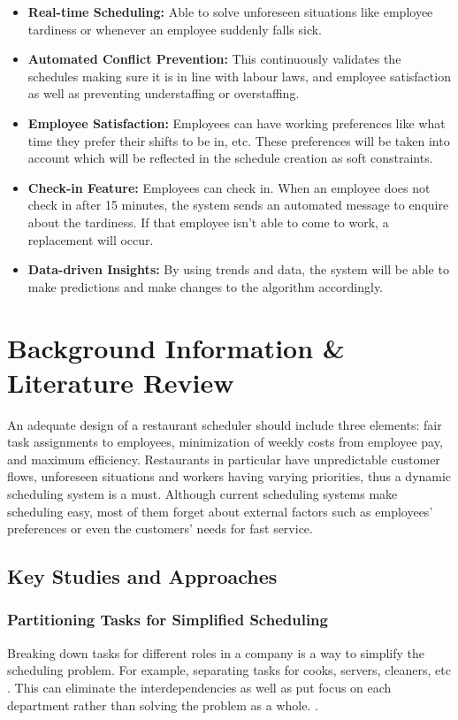 \documentclass[a4paper,12pt, oneside]{report}
\begin{document}
\begin{itemize}
    \item {
    \textbf{Real-time Scheduling:} Able to solve unforeseen situations like employee tardiness or whenever an employee suddenly falls sick.
    }
    \item {
    \textbf{Automated Conflict Prevention:} This continuously validates the schedules making sure it is in line with labour laws, and employee satisfaction as well as preventing understaffing or overstaffing.
    }
    \item {
    \textbf{Employee Satisfaction:} Employees can have working preferences like what time they prefer their shifts to be in, etc. These preferences will be taken into account which will be reflected in the schedule creation as soft constraints.
    }
    \item {
    \textbf{Check-in Feature:} Employees can check in. When an employee does not check in after 15 minutes, the system sends an automated message to enquire about the tardiness. If that employee isn't able to come to work, a replacement will occur.
    }
    \item {
    \textbf{Data-driven Insights:} By using trends and data, the system will be able to make predictions and make changes to the algorithm accordingly.
    }
\end{itemize}

\section{Background Information \& Literature Review}

An adequate design of a restaurant scheduler should include three elements: fair task assignments to employees, minimization of weekly costs from employee pay, and maximum efficiency. Restaurants in particular have unpredictable customer flows, unforeseen situations and workers having varying priorities, thus a dynamic scheduling system is a must. Although current scheduling systems make scheduling easy, most of them forget about external factors such as employees' preferences or even the customers' needs for fast service.\\

\subsection{Key Studies and Approaches}
\subsubsection{Partitioning Tasks for Simplified Scheduling}
Breaking down tasks for different roles in a company is a way to simplify the scheduling problem. For example, separating tasks for cooks, servers, cleaners, etc \citep{blochliger2004modeling}. This can eliminate the interdependencies as well as put focus on each department rather than solving the problem as a whole. .\\
\end{document}
